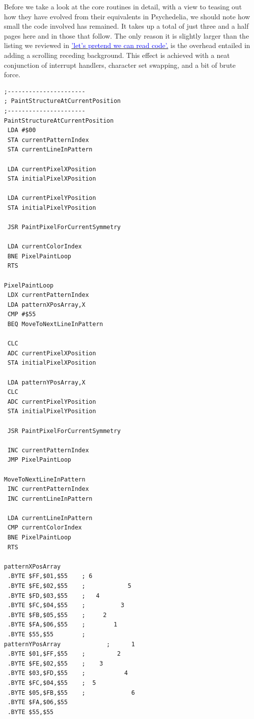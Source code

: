 Before we take a look at the core routines in detail, with a view to teasing out how they have evolved from their equivalents in Psychedelia, we should note how small
the code involved has remained. It takes up a total of just three and a half pages here and in those that follow. The only reason it is slightly larger than the
listing we reviewed in \hyperref[sec:listing_commentary]{\textcolor{blue}{'let's pretend we can read code'.}} is the overhead entailed in adding a scrolling receding
background. This effect is achieved with a neat conjunction of interrupt handlers, character set swapping, and a bit of brute force.

\begin{minipage}[b]{0.33\linewidth}
\begin{lrbox}{\mybox}%
\begin{lstlisting}[basicstyle=\ttfamily\tiny]
;----------------------
; PaintStructureAtCurrentPosition
;----------------------
PaintStructureAtCurrentPosition   
 LDA #$00
 STA currentPatternIndex
 STA currentLineInPattern

 LDA currentPixelXPosition
 STA initialPixelXPosition

 LDA currentPixelYPosition
 STA initialPixelYPosition

 JSR PaintPixelForCurrentSymmetry

 LDA currentColorIndex
 BNE PixelPaintLoop
 RTS 

PixelPaintLoop   
 LDX currentPatternIndex
 LDA patternXPosArray,X
 CMP #$55
 BEQ MoveToNextLineInPattern

 CLC 
 ADC currentPixelXPosition
 STA initialPixelXPosition

 LDA patternYPosArray,X
 CLC 
 ADC currentPixelYPosition
 STA initialPixelYPosition

 JSR PaintPixelForCurrentSymmetry

 INC currentPatternIndex
 JMP PixelPaintLoop

MoveToNextLineInPattern   
 INC currentPatternIndex
 INC currentLineInPattern

 LDA currentLineInPattern
 CMP currentColorIndex
 BNE PixelPaintLoop
 RTS 

patternXPosArray             
 .BYTE $FF,$01,$55    ; 6              
 .BYTE $FE,$02,$55    ;            5   
 .BYTE $FD,$03,$55    ;   4            
 .BYTE $FC,$04,$55    ;          3     
 .BYTE $FB,$05,$55    ;     2          
 .BYTE $FA,$06,$55    ;        1       
 .BYTE $55,$55        ;                
patternYPosArray             ;      1         
 .BYTE $01,$FF,$55    ;         2      
 .BYTE $FE,$02,$55    ;    3           
 .BYTE $03,$FD,$55    ;           4    
 .BYTE $FC,$04,$55    ;  5             
 .BYTE $05,$FB,$55    ;             6 
 .BYTE $FA,$06,$55
 .BYTE $55,$55



\end{lstlisting}
\end{lrbox}
\end{minipage}
